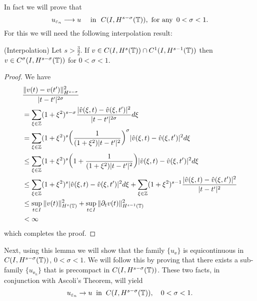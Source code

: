 In fact we will prove that 
%
\begin{equation}
\label{strong-conv}
u_{\varepsilon_n}\longrightarrow u
\quad
 \ \text{in} \ \,\,   C(I, H^{s-\sigma}(\mathbb{T})),\ \text{for any} \
\, 0 < \sigma <
1.
\end{equation}
%
For this we will need the following interpolation  result:
%
%
%
%
\begin{lemma}
\label{interpolation-lem}
(Interpolation)     Let  $s > \frac{3}{2}$.
If $v \in C(I, H^s(\mathbb{T})) \cap C^1(I, H^{s-1}(\mathbb{T}))$
then $v \in C^\sigma (I, H^{s- \sigma}(\mathbb{T}))$ for  $0 < \sigma < 1$.
\end{lemma}
%
\begin{proof} We have
\begin{equation*}
\begin{split}
& \frac{\|v(t) - v(t')\|^2_{H^{s - \sigma}}}{|t - t'|^{2\sigma}}
\\
& = 
\sum_{\xi \in \mathbb{Z}} (1 + \xi^2)^{s- \sigma} 
\frac{|\hat{v}(\xi, t) - \hat{v}(\xi, t')|^2}{|t-t'|^{2\sigma}} d\xi\\
& = \sum_{\xi \in \mathbb{Z}} (1+\xi^2)^s 
\bigg(\frac{1}{(1+ \xi^2)|t - t'|^2} \bigg)^\sigma |\hat{v}(\xi, t)- \hat{v}(\xi, t')|^2 d\xi\\
& \leq \sum_{\xi \in \mathbb{Z}}(1+\xi^2)^s \bigg( 1 + \frac{1}{(1+\xi^2)|t-t'|^2} \bigg)
|\hat{v}(\xi,t) - \hat{v}(\xi,t')|^2 d\xi \\
& \leq \sum_{\xi \in \mathbb{Z}} (1+ \xi^2)^s |\hat{v}(\xi, t)- \hat{v}(\xi, t')|^2 d\xi
+ \sum_{\xi \in \mathbb{Z}} (1+ \xi^2)^{s-1} \frac{|\hat{v}(\xi, t) - \hat{v} (\xi, t')|^2}{|t-t'|^2} \\
& \leq  \sup_{t \in I} \|v(t)\|_{H^s(\mathbb{T})}^2 + \sup_{t \in I}
\| \partial_t v(t) \|_{H^{s-1}(\mathbb{T})}^2
\\
& < \infty
\end{split}
\end{equation*}
%
which completes the proof.
\end{proof}
%
Next, using this lemma we will show that the family $\{u_\ee\}$ is
equicontinuous in $C(I, H^{s-\sigma}(\mathbb{T}))$, $0 < \sigma < 1$. We
will follow this by proving that there exists a sub-family
$\{u_{\ee_n} \}$ that is precompact in $C(I,
H^{s-\sigma}(\mathbb{T}))$. These two facts, in conjunction with Ascoli's
Theorem, will yield
\begin{equation}
\label{strong-conv2}
u_{\varepsilon_n} \to u \; \; \text{in} \; \; C(I,H^{s-\sigma}(\mathbb{T})),
\quad
0 < \sigma < 1.
\end{equation}
%
%
%
%
%
